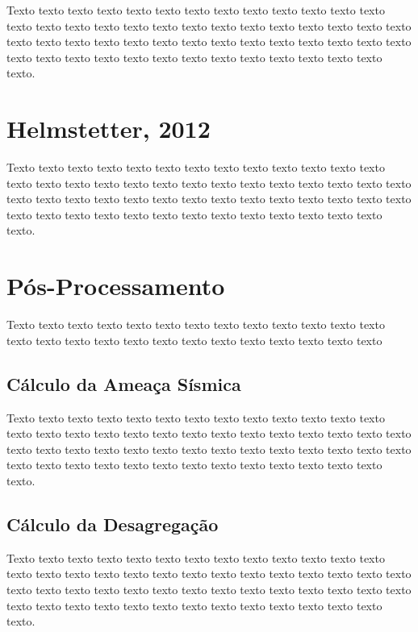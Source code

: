 Texto texto texto texto texto texto texto texto texto texto texto texto texto
texto texto texto texto texto texto texto texto texto texto texto texto texto
texto texto texto texto texto texto texto texto texto texto texto texto texto
texto texto texto texto texto texto texto texto texto texto texto texto texto
texto texto texto.

\section{Helmstetter, 2012}
\label{sec:fundamentos}

Texto texto texto texto texto texto texto texto texto texto texto texto texto
texto texto texto texto texto texto texto texto texto texto texto texto texto
texto texto texto texto texto texto texto texto texto texto texto texto texto
texto texto texto texto texto texto texto texto texto texto texto texto texto
texto texto texto.


\section{Pós-Processamento}
\label{sec:fundamentos}

Texto texto texto texto texto texto texto texto texto texto texto texto texto
texto texto texto texto texto texto texto texto texto texto texto texto texto


\subsection{Cálculo da Ameaça Sísmica}
\label{sec:fundamentos}

Texto texto texto texto texto texto texto texto texto texto texto texto texto
texto texto texto texto texto texto texto texto texto texto texto texto texto
texto texto texto texto texto texto texto texto texto texto texto texto texto
texto texto texto texto texto texto texto texto texto texto texto texto texto
texto texto texto.


\subsection{Cálculo da Desagregação}
\label{sec:fundamentos}

Texto texto texto texto texto texto texto texto texto texto texto texto texto
texto texto texto texto texto texto texto texto texto texto texto texto texto
texto texto texto texto texto texto texto texto texto texto texto texto texto
texto texto texto texto texto texto texto texto texto texto texto texto texto
texto texto texto.


